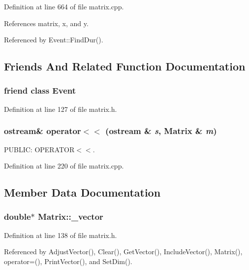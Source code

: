 Definition at line 664 of file matrix.cpp.

References matrix, x, and y.

Referenced by Event::Find\-Dur().

\subsection{Friends And Related Function Documentation}
\subsubsection{\setlength{\rightskip}{0pt plus 5cm}friend class {\bf Event}\hspace{0.3cm}{\tt  [friend]}}\label{classMatrix_n0}




Definition at line 127 of file matrix.h.
\subsubsection{\setlength{\rightskip}{0pt plus 5cm}ostream\& operator$<$$<$ (ostream \& {\em s}, {\bf Matrix} \& {\em m})\hspace{0.3cm}{\tt  [friend]}}\label{classMatrix_n1}


PUBLIC: OPERATOR$<$$<$. 

Definition at line 220 of file matrix.cpp.

\subsection{Member Data Documentation}
\subsubsection{\setlength{\rightskip}{0pt plus 5cm}double$\ast$ {\bf Matrix::\_\-vector}\hspace{0.3cm}{\tt  [private]}}\label{classMatrix_r4}




Definition at line 138 of file matrix.h.

Referenced by Adjust\-Vector(), Clear(), Get\-Vector(), Include\-Vector(), Matrix(), operator=(), Print\-Vector(), and Set\-Dim().
